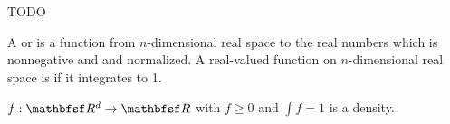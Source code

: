 
\sbasic




















\sstart
{}


TODO


A 
or  is a
function from $n$-dimensional
real space to the real numbers
which is nonnegative and
and normalized.
A real-valued function on $n$-dimensional
real space
is  if it integrates
to 1.


$f: \R^d \to \R$ with $f \geq 0$ and
$\int f = 1$ is a density.

\strats
